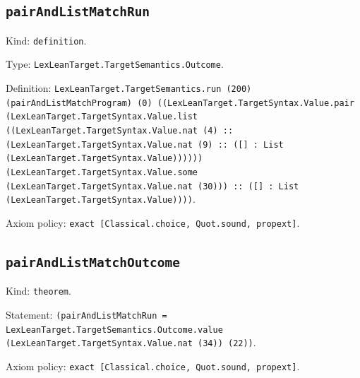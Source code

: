 \documentclass[11pt]{article}
\begin{document}
\subsection*{\texttt{pairAndListMatchRun}}
\noindent Kind: \texttt{definition}.\par
\noindent Type: \texttt{LexLeanTarget.TargetSemantics.Outcome}.\par
\noindent Definition: \texttt{LexLeanTarget.TargetSemantics.run (200) (pairAndListMatchProgram) (0) ((LexLeanTarget.TargetSyntax.Value.pair (LexLeanTarget.TargetSyntax.Value.list ((LexLeanTarget.TargetSyntax.Value.nat (4) :: (LexLeanTarget.TargetSyntax.Value.nat (9) :: ([] : List (LexLeanTarget.TargetSyntax.Value)))))) (LexLeanTarget.TargetSyntax.Value.some (LexLeanTarget.TargetSyntax.Value.nat (30))) :: ([] : List (LexLeanTarget.TargetSyntax.Value))))}.\par
\noindent Axiom policy: \texttt{exact [Classical.choice, Quot.sound, propext]}.\par
\subsection*{\texttt{pairAndListMatchOutcome}}
\noindent Kind: \texttt{theorem}.\par
\noindent Statement: \texttt{(pairAndListMatchRun = LexLeanTarget.TargetSemantics.Outcome.value (LexLeanTarget.TargetSyntax.Value.nat (34)) (22))}.\par
\noindent Axiom policy: \texttt{exact [Classical.choice, Quot.sound, propext]}.\par
\end{document}
